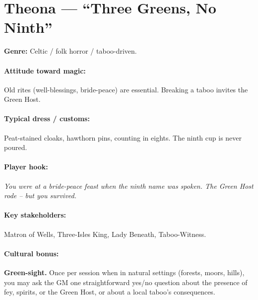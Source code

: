 \section{Theona --- ``Three Greens, No Ninth''}
\textbf{Genre:} Celtic / folk horror / taboo-driven.

\paragraph{Attitude toward magic:} Old rites (well-blessings, bride-peace) are essential. Breaking a taboo invites the Green Host.

\paragraph{Typical dress / customs:} Peat-stained cloaks, hawthorn pins, counting in eights. The ninth cup is never poured.

\paragraph{Player hook:} \emph{You were at a bride-peace feast when the ninth name was spoken. The Green Host rode -- but you survived.}

\paragraph{Key stakeholders:} Matron of Wells, Three-Isles King, Lady Beneath, Taboo-Witness.

\paragraph{Cultural bonus:} \textbf{Green-sight.} Once per session when in natural settings (forests, moors, hills), you may ask the GM one straightforward yes/no question about the presence of fey, spirits, or the Green Host, or about a local taboo's consequences.


